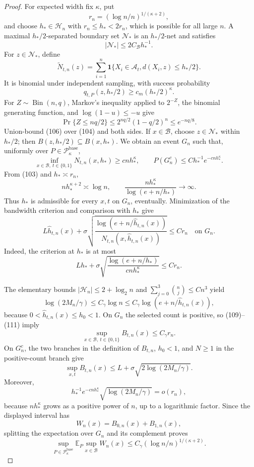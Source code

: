 \documentclass{article}
\begin{document}
\begin{proof}
For expected width fix \(\kappa\), put
\[
 r_n=(\log n/n)^{1/(\kappa+2)},
 \tag{103}
\]
and choose \(h_*\in\mathcal H_n\) with \(r_n\le h_*<2r_n\), which is
possible for all large \(n\).  A maximal \(h_*/2\)-separated boundary
set \(\mathcal N_*\) is an \(h_*/2\)-net and satisfies
\[
 |\mathcal N_*|\le2C_{\mathcal B}h_*^{-1}.
 \tag{104}
\]
For \(z\in\mathcal N_*\), define
\[
 \widetilde N_{t,n}(z)=\sum_{i=1}^n
 \mathbf1\{X_i\in\mathcal A_t, d(X_i,z)\le h_*/2\}.
\]
It is binomial under independent sampling, with success probability
\[
 q_{t,P}(z,h_*/2)\ge c_m(h_*/2)^\kappa.
 \tag{105}
\]
For \(Z\sim\operatorname{Bin}(n,q)\), Markov's inequality applied to
\(2^{-Z}\), the binomial generating function, and
\(\log(1-u)\le-u\) give
\[
 \Pr\{Z\le nq/2\}
 \le2^{nq/2}(1-q/2)^n
 \le e^{-nq/8}.
 \tag{106}
\]
Union-bound (106) over (104) and both sides.  If \(x\in\mathcal B\),
choose \(z\in\mathcal N_*\) within \(h_*/2\); then
\(B(z,h_*/2)\subseteq B(x,h_*)\).  We obtain an event \(G_n\) such that,
uniformly over \(P\in\mathcal P_\kappa^{\mathrm{base}}\),
\[
 \inf_{x\in\mathcal B,\ t\in\{0,1\}}N_{t,n}(x,h_*)
 \ge cnh_*^\kappa,
 \qquad
 P(G_n^c)\le Ch_*^{-1}e^{-cnh_*^\kappa}.
 \tag{107}
\]
From (103) and \(h_*\asymp r_n\),
\[
 nh_*^{\kappa+2}\asymp\log n,
 \qquad
 \frac{nh_*^\kappa}{\log(e+n/h_*)}\longrightarrow\infty.
 \tag{108}
\]
Thus \(h_*\) is admissible for every \(x,t\) on \(G_n\), eventually.
Minimization of the bandwidth criterion and comparison with \(h_*\)
give
\[
 L\widehat h_{t,n}(x)+
 \sigma\sqrt{\frac{\log(e+n/\widehat h_{t,n}(x))}
 {N_{t,n}(x,\widehat h_{t,n}(x))}}
 \le C r_n
 \quad\text{on }G_n.
 \tag{109}
\]
Indeed, the criterion at \(h_*\) is at most
\[
 Lh_*+\sigma\sqrt{\frac{\log(e+n/h_*)}{cnh_*^\kappa}}
 \le Cr_n.
 \tag{110}
\]

The elementary bounds \(|\mathcal H_n|\le2+\log_2n\) and
\(\sum_{j=0}^3\binom nj\le Cn^3\) yield
\[
 \log(2M_n/\gamma)\le C_\gamma\log n
 \le C_\gamma\log(e+n/\widehat h_{t,n}(x)),
 \tag{111}
\]
because \(0<\widehat h_{t,n}(x)\le h_0<1\).  On \(G_n\) the selected
count is positive, so (109)--(111) imply
\[
 \sup_{x\in\mathcal B,\ t\in\{0,1\}}B_{t,n}(x)
 \le C_\gamma r_n.
 \tag{112}
\]
On \(G_n^c\), the two branches in the definition of \(B_{t,n}\),
\(h_0<1\), and \(N\ge1\) in the positive-count branch give
\[
 \sup_{x,t}B_{t,n}(x)
 \le L+\sigma\sqrt{2\log(2M_n/\gamma)}.
 \tag{113}
\]
Moreover,
\[
 h_*^{-1}e^{-cnh_*^\kappa}
 \sqrt{\log(2M_n/\gamma)}=o(r_n),
 \tag{114}
\]
because \(nh_*^\kappa\) grows as a positive power of \(n\), up to a
logarithmic factor.  Since the displayed interval has
\[
 W_n(x)=B_{0,n}(x)+B_{1,n}(x),
 \tag{115}
\]
splitting the expectation over \(G_n\) and its complement proves
\[
 \sup_{P\in\mathcal P_\kappa^{\mathrm{base}}}
 \mathbb E_P\sup_{x\in\mathcal B}W_n(x)
 \le C_\gamma(\log n/n)^{1/(\kappa+2)}.
 \tag{116}
\]


\end{proof}
\end{document}
